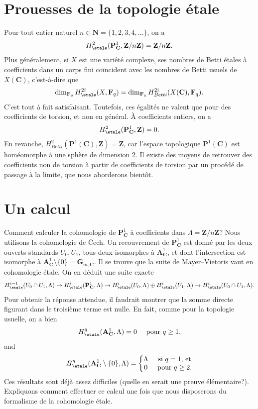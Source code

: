 \section{Prouesses de la topologie \'etale}
\label{section-feats}

\noindent
Pour tout entier naturel $n \in \mathbf{N} = \{1, 2, 3, 4, \ldots\}$, on a
$$
H_\etale^2 (\mathbf{P}^1_\mathbf{C}, \mathbf{Z}/n\mathbf{Z}) =
\mathbf{Z}/n\mathbf{Z}.
$$
Plus g\'en\'eralement, si $X$ est une vari\'et\'e complexe, ses nombres de Betti
\'etales \`a coefficients dans un corps fini co\"incident avec les nombres de
Betti usuels de $X(\mathbf{C})$, c'est-\`a-dire que
$$
\dim_{\mathbf{F}_q} H_\etale^{2i} (X, \mathbf{F}_q) =
\dim_{\mathbf{F}_q} H_{Betti}^{2i} (X(\mathbf{C}), \mathbf{F}_q).
$$
C'est tout \`a fait satisfaisant. Toutefois, ces \'egalit\'es ne valent que pour des
coefficients de torsion, et non en g\'en\'eral. \`A coefficients entiers, on a
$$
H_\etale^2 (\mathbf{P}^1_\mathbf{C}, \mathbf{Z}) = 0.
$$
En revanche,
$H_{Betti}^2(\mathbf{P}^1(\mathbf{C}), \mathbf{Z}) = \mathbf{Z}$, car l'espace
topologique $\mathbf{P}^1(\mathbf{C})$ est hom\'eomorphe \`a une sph\`ere de
dimension $2$. Il existe des moyens de retrouver des coefficients non de
torsion \`a partir de coefficients de torsion par un proc\'ed\'e de passage \`a la
limite, que nous aborderons bient\^ot.




\section{Un calcul}
\label{section-computation}

\noindent
Comment calculer la cohomologie de $\mathbf{P}^1_\mathbf{C}$ \`a coefficients
dans $\Lambda = \mathbf{Z}/n\mathbf{Z}$?
Nous utilisons la cohomologie de {\v C}ech. Un recouvrement de
$\mathbf{P}^1_\mathbf{C}$ est donn\'e par les deux ouverts standards $U_0, U_1$,
tous deux isomorphes \`a $\mathbf{A}^1_\mathbf{C}$, et dont l'intersection est
isomorphe \`a
$\mathbf{A}^1_\mathbf{C} \setminus \{0\} = \mathbf{G}_{m, \mathbf{C}}$.
Il se trouve que la suite de Mayer--Vietoris vaut en cohomologie \'etale. On en
d\'eduit une suite exacte
$$
H_\etale^{i-1}(U_0\cap U_1, \Lambda) \to
H_\etale^i(\mathbf{P}^1_\mathbf{C}, \Lambda) \to
H_\etale^i(U_0, \Lambda) \oplus
H_\etale^i(U_1, \Lambda) \to H_\etale^i(U_0\cap U_1,
\Lambda).
$$
Pour obtenir la r\'eponse attendue, il faudrait montrer que la somme directe
figurant dans le troisi\`eme terme est nulle. En fait, comme pour la topologie
usuelle, on a bien
$$
H_\etale^q (\mathbf{A}^1_\mathbf{C}, \Lambda) = 0
\quad \text{ pour } q \geq 1,
$$
and
$$
H_\etale^q (\mathbf{A}^1_\mathbf{C} \setminus \{0\}, \Lambda) = \left\{
\begin{matrix}
\Lambda & \text{ si }q = 1\text{, et} \\
0 & \text{ pour }q \geq 2.
\end{matrix}
\right.
$$
Ces r\'esultats sont d\'ej\`a assez difficiles (quelle en serait une preuve
\'el\'ementaire?). Expliquons comment effectuer ce calcul une fois que nous
disposerons du formalisme de la cohomologie \'etale.

